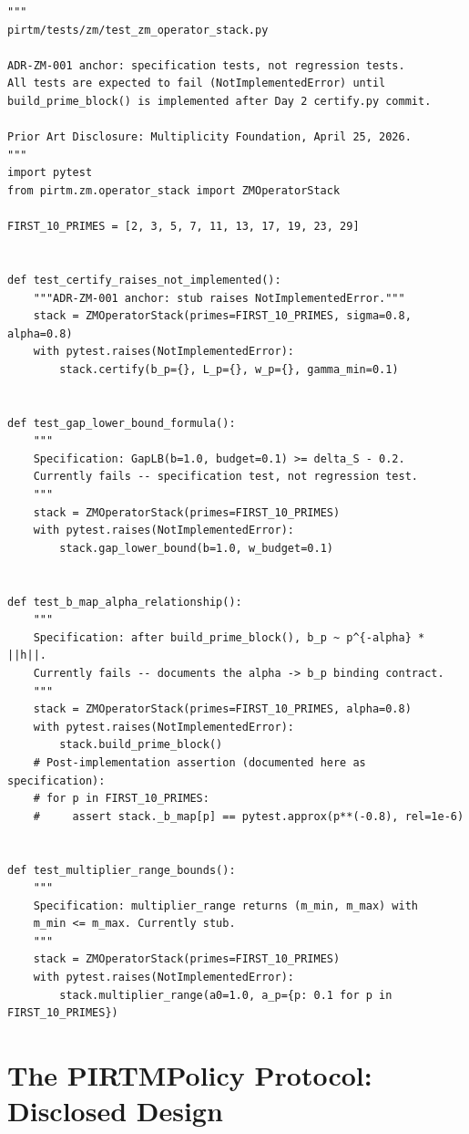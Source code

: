 \documentclass[12pt,letterpaper]{article}
\theoremstyle{definition}
\theoremstyle{remark}
\begin{document}
\begin{lstlisting}[caption={Specification test for ZMOperatorStack --- known-failing ADR anchor},
                   label={lst:zm-test}]
"""
pirtm/tests/zm/test_zm_operator_stack.py

ADR-ZM-001 anchor: specification tests, not regression tests.
All tests are expected to fail (NotImplementedError) until
build_prime_block() is implemented after Day 2 certify.py commit.

Prior Art Disclosure: Multiplicity Foundation, April 25, 2026.
"""
import pytest
from pirtm.zm.operator_stack import ZMOperatorStack

FIRST_10_PRIMES = [2, 3, 5, 7, 11, 13, 17, 19, 23, 29]


def test_certify_raises_not_implemented():
    """ADR-ZM-001 anchor: stub raises NotImplementedError."""
    stack = ZMOperatorStack(primes=FIRST_10_PRIMES, sigma=0.8, alpha=0.8)
    with pytest.raises(NotImplementedError):
        stack.certify(b_p={}, L_p={}, w_p={}, gamma_min=0.1)


def test_gap_lower_bound_formula():
    """
    Specification: GapLB(b=1.0, budget=0.1) >= delta_S - 0.2.
    Currently fails -- specification test, not regression test.
    """
    stack = ZMOperatorStack(primes=FIRST_10_PRIMES)
    with pytest.raises(NotImplementedError):
        stack.gap_lower_bound(b=1.0, w_budget=0.1)


def test_b_map_alpha_relationship():
    """
    Specification: after build_prime_block(), b_p ~ p^{-alpha} * ||h||.
    Currently fails -- documents the alpha -> b_p binding contract.
    """
    stack = ZMOperatorStack(primes=FIRST_10_PRIMES, alpha=0.8)
    with pytest.raises(NotImplementedError):
        stack.build_prime_block()
    # Post-implementation assertion (documented here as specification):
    # for p in FIRST_10_PRIMES:
    #     assert stack._b_map[p] == pytest.approx(p**(-0.8), rel=1e-6)


def test_multiplier_range_bounds():
    """
    Specification: multiplier_range returns (m_min, m_max) with
    m_min <= m_max. Currently stub.
    """
    stack = ZMOperatorStack(primes=FIRST_10_PRIMES)
    with pytest.raises(NotImplementedError):
        stack.multiplier_range(a0=1.0, a_p={p: 0.1 for p in FIRST_10_PRIMES})
\end{lstlisting}

\section{The PIRTMPolicy Protocol: Disclosed Design}
\label{sec:policy}
\end{document}
